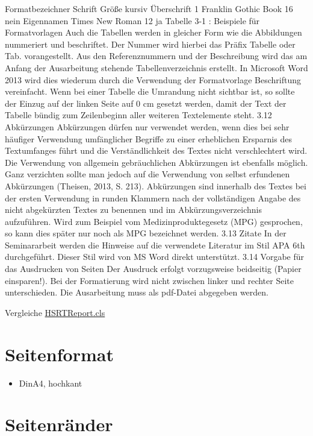 	Formatbezeichner	Schrift	Größe	kursiv
	Überschrift 1	Franklin Gothic Book	16	nein
	Eigennamen	Times New Roman	12	ja
	Tabelle 3-1 : Beispiele für Formatvorlagen
	Auch die Tabellen werden in gleicher Form wie die Abbildungen nummeriert und beschriftet. Der Nummer wird hierbei das Präfix Tabelle oder Tab. vorangestellt. Aus den Referenznummern und der Beschreibung wird das am Anfang der Ausarbeitung stehende Tabellenverzeichnis erstellt. In Microsoft Word 2013 wird dies wiederum durch die Verwendung der Formatvorlage Beschriftung vereinfacht.
	Wenn bei einer Tabelle die Umrandung nicht sichtbar ist, so sollte der Einzug auf der linken Seite auf 0 cm gesetzt werden, damit der Text der Tabelle bündig zum Zeilenbeginn aller weiteren Textelemente steht.
	3.12	Abkürzungen
	Abkürzungen dürfen nur verwendet werden, wenn dies bei sehr häufiger Verwendung umfänglicher Begriffe zu einer erheblichen Ersparnis des Textumfanges führt und die Verständlichkeit des Textes nicht verschlechtert wird. Die Verwendung von allgemein gebräuchlichen Abkürzungen ist ebenfalls möglich. Ganz verzichten sollte man jedoch auf die Verwendung von selbst erfundenen Abkürzungen (Theisen, 2013, S. 213).
	Abkürzungen sind innerhalb des Textes bei der ersten Verwendung in runden Klammern nach der vollständigen Angabe des nicht abgekürzten Textes zu benennen und im Abkürzungsverzeichnis aufzuführen. Wird zum Beispiel vom Medizinproduktegesetz (MPG) gesprochen, so kann dies später nur noch als MPG bezeichnet werden.
	3.13	Zitate
	In der Seminararbeit werden die Hinweise auf die verwendete Literatur im Stil APA 6th durchgeführt. Dieser Stil wird von MS Word direkt unterstützt.
	3.14	Vorgabe für das Ausdrucken von Seiten
	Der Ausdruck erfolgt vorzugsweise beidseitig (Papier einsparen!). Bei der Formatierung wird nicht zwischen linker und rechter Seite unterschieden.
	Die Ausarbeitung muss als pdf-Datei abgegeben werden.

\fi

Vergleiche \href{https://git.beimgraben.net/frederik/SAT-WiSe-25-26/src/branch/main/HSRTReport}{HSRTReport.cls}

\section{Seitenformat}

\begin{itemize}
	\item DinA4, hochkant
\end{itemize}

\section{Seitenränder}


